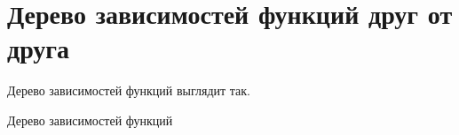 \section{Дерево зависимостей функций друг от друга}

Дерево зависимостей функций выглядит так.
\begin{image}
    \caption{Дерево зависимостей функций}
    \label{fig:funcTree}
\end{image}


